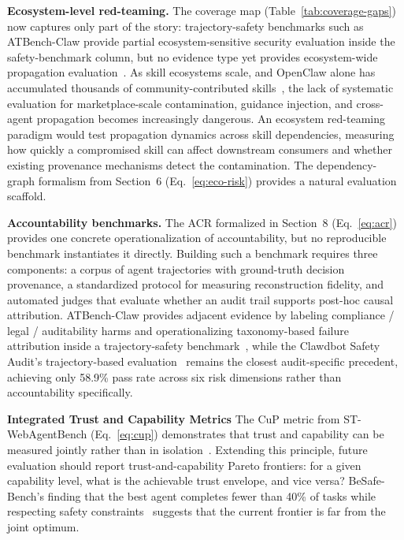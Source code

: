 \smallskip
\noindent\textbf{Ecosystem-level red-teaming.}
The coverage map (Table~\ref{tab:coverage-gaps}) now captures only part of the story: trajectory-safety benchmarks such as ATBench-Claw provide partial ecosystem-sensitive security evaluation inside the safety-benchmark column, but no evidence type yet provides ecosystem-wide propagation evaluation~\cite{atbenchclaw2026}. As skill ecosystems scale, and OpenClaw alone has accumulated thousands of community-contributed skills~\cite{openclaw2026}, the lack of systematic evaluation for marketplace-scale contamination, guidance injection, and cross-agent propagation becomes increasingly dangerous. An ecosystem red-teaming paradigm would test propagation dynamics across skill dependencies, measuring how quickly a compromised skill can affect downstream consumers and whether existing provenance mechanisms detect the contamination. The dependency-graph formalism from Section~6 (Eq.~\ref{eq:eco-risk}) provides a natural evaluation scaffold.

\smallskip
\noindent\textbf{Accountability benchmarks.}
The ACR formalized in Section~8 (Eq.~\ref{eq:acr}) provides one concrete operationalization of accountability, but no reproducible benchmark instantiates it directly. Building such a benchmark requires three components: a corpus of agent trajectories with ground-truth decision provenance, a standardized protocol for measuring reconstruction fidelity, and automated judges that evaluate whether an audit trail supports post-hoc causal attribution. ATBench-Claw provides adjacent evidence by labeling compliance / legal / auditability harms and operationalizing taxonomy-based failure attribution inside a trajectory-safety benchmark~\cite{atbenchclaw2026}, while the Clawdbot Safety Audit's trajectory-based evaluation~\cite{clawaudit2026} remains the closest audit-specific precedent, achieving only 58.9\% pass rate across six risk dimensions rather than accountability specifically.

\smallskip
\noindent\textbf{Integrated Trust and Capability Metrics}
The CuP metric from ST-WebAgentBench (Eq.~\ref{eq:cup}) demonstrates that trust and capability can be measured jointly rather than in isolation~\cite{stwebagentbench2025}. Extending this principle, future evaluation should report trust-and-capability Pareto frontiers: for a given capability level, what is the achievable trust envelope, and vice versa? BeSafe-Bench's finding that the best agent completes fewer than 40\% of tasks while respecting safety constraints~\cite{besafebench2026} suggests that the current frontier is far from the joint optimum.

